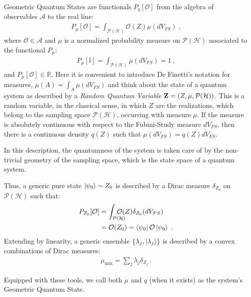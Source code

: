 \documentclass[draft,nofootinbib,pre,twocolumn,showpacs,showkeys,preprintnumbers,floatfix]{revtex4-1}
\newcommand{\1}{\mathbbm{1}}
\newcommand{\intP}{\int_{\mathcal{P}(\mathcal{H})} \!\!\!\!\!\!\!\!\!}
\newcommand{\PH}{\mathcal{P}(\mathcal{H})}
\begin{document}
Geometric Quantum States are functionals $P_q[\mathcal{O}]$ from the algebra of
observables $\mathcal{A}$ to the real line: 
\begin{align}
P_\mu[\mathcal{O}]
  = \int_{\mathcal{P}(\mathcal{H})}  \mathcal{O}(Z) \mu(dV_{FS})
  ~,
\label{eq:gqs}
\end{align}
where $\mathcal{O} \in \mathcal{A}$ and $\mu $ is a normalized probability
measure on $\PH$ associated to the functional $P_\mu$:
\begin{align*}
P_\mu[\mathbb{I}] = \int_{\mathcal{P}(\mathcal{H})}
 \mu(dV_{FS})  = 1
  ~,
\end{align*}
and $P_\mu[\mathcal{O}] \in \mathbb{R}$. Here it is convenient to introduce
De Finetti's notation for measures, $\mu(A) = \int_{A} \mu(dV_{FS})$ and 
think about the state of a quantum system as described by a \emph{Random Quantum Variable} ${\bf Z} = 
(Z,\mu,\PH)$. This is a random variable, in the classical sense, in which $Z$
are the realizations, which belong to the sampling space $\PH$, occurring 
with measure $\mu$. If the measure is absolutely continuous with respect to the
Fubini-Study measure $dV_{FS}$, then there is a continuous density $q(Z)$
such that $\mu(dV_{FS}) = q(Z)dV_{FS}$. 

In this description, the quantumness of the system is taken care of by the non-trivial 
geometry of the sampling space, which is the state 
space of a quantum system.


Thus, a generic pure state $\ket{\psi_0} \sim Z_0$ is described by a Dirac measure 
 $\delta_{Z_0}$ on $\PH$ such that:
\begin{align*}
P_{Z_0}[\mathcal{O}] &= \intP \mathcal{O}(Z) \delta_{Z_0}(dV_{FS}) \\
  & = \mathcal{O}(Z_0)  = \bra{\psi_0}\mathcal{O}\ket{\psi_0}
  ~.
\end{align*}
Extending by linearity, a generic ensemble $\left\{ \lambda_j, \ket{\lambda_j}\right\}$
is described by a convex combinations of Dirac measures:
\begin{align*}
\mu_{\mathrm{mix}} = \sum_{j}\lambda_j \delta_{Z_j}
  ~. 
\end{align*}
 
Equipped with these tools, we call both $\mu$ and $q$ (when it exists) as the system's
Geometric Quantum State.  

\end{document}
